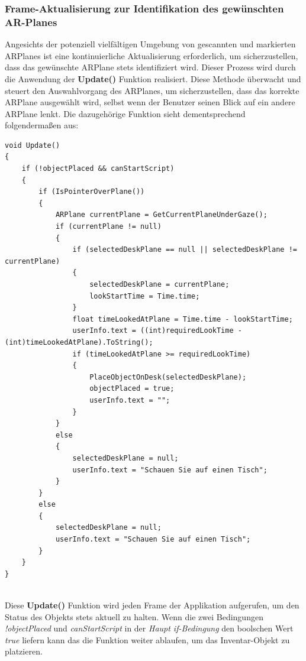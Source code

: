 \subsubsection{Frame-Aktualisierung zur Identifikation des gewünschten AR-Planes}
Angesichts der potenziell vielfältigen Umgebung von gescannten und markierten ARPlanes ist eine kontinuierliche Aktualisierung
erforderlich, um sicherzustellen, dass das gewünschte ARPlane stets identifiziert wird. Dieser Prozess wird durch die
Anwendung der \textbf{Update()} Funktion realisiert. Diese Methode überwacht und steuert den Auswahlvorgang des ARPlanes,
um sicherzustellen, dass das korrekte ARPlane ausgewählt wird, selbst wenn der Benutzer seinen Blick auf ein andere ARPlane
lenkt. Die dazugehörige Funktion sieht dementsprechend folgendermaßen aus:
\begin{lstlisting}[style=csharp, caption={Update Funktion}, label=code:Update]
void Update()
{
    if (!objectPlaced && canStartScript)
    {
        if (IsPointerOverPlane())
        {
            ARPlane currentPlane = GetCurrentPlaneUnderGaze();
            if (currentPlane != null)
            {
                if (selectedDeskPlane == null || selectedDeskPlane != currentPlane)
                {
                    selectedDeskPlane = currentPlane;
                    lookStartTime = Time.time;
                }
                float timeLookedAtPlane = Time.time - lookStartTime;
                userInfo.text = ((int)requiredLookTime - (int)timeLookedAtPlane).ToString();
                if (timeLookedAtPlane >= requiredLookTime)
                {
                    PlaceObjectOnDesk(selectedDeskPlane);
                    objectPlaced = true;
                    userInfo.text = "";
                }
            }
            else
            {
                selectedDeskPlane = null;
                userInfo.text = "Schauen Sie auf einen Tisch";
            }
        }
        else
        {
            selectedDeskPlane = null;
            userInfo.text = "Schauen Sie auf einen Tisch";
        }
    }
}
\end{lstlisting}
\\
Diese \textbf{Update()} Funktion wird jeden Frame der Applikation aufgerufen, um den Status des Objekts stets aktuell zu
halten. Wenn die zwei Bedingungen \textit{!objectPlaced} und \textit{canStartScript} in der \textit{Haupt if-Bedingung}
den boolschen Wert \textit{true} liefern kann das die Funktion weiter ablaufen, um das Inventar-Objekt zu platzieren.
\\
\\
